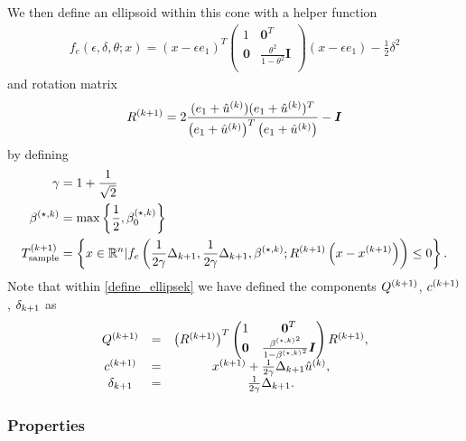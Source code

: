 We then define an ellipsoid within this cone with a helper function
\begin{align}
f_e(\epsilon, \delta, \theta; x) = (x - \epsilon e_1)^T\begin{pmatrix}
1 & \boldsymbol0^T \\
\boldsymbol 0 & \frac{\theta^2}{1 - \theta^2} \boldsymbol I \\
\end{pmatrix}(x - \epsilon e_1) - \frac 1 2 \delta^2 \label{define_ellipse_function}
\end{align}
and rotation matrix
\begin{align}
{R^{(k+1)}} = 2\frac{(e_1 + {{\hat u}^{(k)}})(e_1 + {{\hat u}^{(k)}})^T}{\left(e_1 + {{\hat u}^{(k)}}\right)^T\left(e_1 + {{\hat u}^{(k)}}\right)} - \boldsymbol I \label{define_rotation}
\end{align}
by defining
\begin{align}
\gamma &= 1 + \frac 1 {\sqrt{2}} \label{define_the_constant_gamma} \\
{\beta^{(\star, k)}} &= \max\left\{\frac 1 2 , {\beta_0^{(\star, k)}}\right\} \label{define_bs} \\
{T_{\text{sample}}^{(k+1)}} &= \left\{x \in \mathbb R^n | f_e\left(\frac 1 {2\gamma} \Delta_{k+1}, \frac 1 {2\gamma} \Delta_{k+1},{\beta^{(\star, k)}}; {R^{(k+1)}}\left(x - {{x}^{(k+1)}}\right)\right) \le 0\right\}. \label{define_ellipsek}
\end{align}
Note that within \cref{define_ellipsek} we have defined the components ${Q^{(k+1)}}$, ${c^{(k+1)}}$, ${\delta_{k+1}}$ as
\begin{align}
\begin{array}{ccc}
{Q^{(k+1)}} &=& \left({R^{(k+1)}}\right)^T \begin{pmatrix}
1 & \boldsymbol0^T \\
\boldsymbol 0 & \frac{{\beta^{(\star, k)}}^2}{1 - {\beta^{(\star, k)}}^2} \boldsymbol I \\
\end{pmatrix} {R^{(k+1)}}, \\
{c^{(k+1)}} &=& {{x}^{(k+1)}} + \frac 1 {2\gamma} \Delta_{k+1} {{\hat u}^{(k)}}, \\
{\delta_{k+1}} &=& \frac 1 {2\gamma} \Delta_{k+1}. 
\end{array}\label{conservative_ellipsoid_details}
\end{align}


\subsubsection{Properties}
\label{feasible_ellipsoid_analysis}

